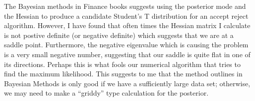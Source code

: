 \documentclass{article}
\begin{document}
\begin{description}
The Bayesian methods in Finance books suggests using the posterior mode and the Hessian to produce a candidate Student's T distribution for an accept reject algorithm.  However, I have found that often times the Hessian matrix I calculate is not postive definite (or negative definite) which suggests that we are at a saddle point.  Furthermore, the negative eigenvalue which is causing the problem is a very small negative number, suggesting that our saddle is quite flat in one of its directions.  Perhaps this is what fools our numerical algorithm that tries to find the maximum likelihood.  This suggests to me that the method outlines in Bayesian Methods is only good if we have a sufficiently large data set; otherwise, we may need to make a ``griddy'' type calculation for the posterior.

\end{description}
\end{document}
